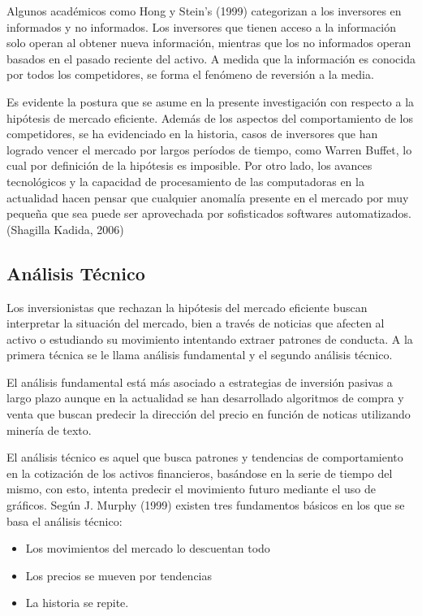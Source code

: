 \documentclass[a4paper,12pt]{Latex/Classes/PhDthesisPSnPDF}
\begin{document}
Algunos académicos como Hong y Stein's (1999) categorizan a los inversores en informados y no informados. Los inversores que tienen acceso a la información solo operan al obtener nueva información, mientras que los no informados operan basados en el pasado reciente del activo. A medida que la información es conocida por todos los competidores, se forma el fenómeno de reversión a la media.

Es evidente la postura que se asume en la presente investigación con respecto a la hipótesis de mercado eficiente. Además de los aspectos del comportamiento de los competidores, se ha evidenciado en la historia, casos de inversores que han logrado vencer el mercado por largos períodos de tiempo, como Warren Buffet, lo cual por definición de la hipótesis es imposible. Por otro lado, los avances tecnológicos y la capacidad de procesamiento de las computadoras en la actualidad hacen pensar que cualquier anomalía presente en el mercado por muy pequeña que sea puede ser aprovechada por sofisticados softwares automatizados. (Shagilla Kadida, 2006)

\subsection{Análisis Técnico}

Los inversionistas que rechazan la hipótesis del mercado eficiente buscan interpretar la situación del mercado, bien a través de noticias que afecten al activo o estudiando su movimiento intentando extraer patrones de conducta. A la primera técnica se le llama análisis fundamental y el segundo análisis técnico. 

El análisis fundamental está más asociado a estrategias de inversión pasivas a largo plazo aunque en la actualidad se han desarrollado algoritmos de compra y venta que buscan predecir la dirección del precio en función de noticas utilizando minería de texto.

El análisis técnico es aquel que busca patrones y tendencias de comportamiento en la cotización de los activos financieros, basándose en la serie de tiempo del mismo, con esto, intenta predecir el movimiento futuro mediante el uso de gráficos. Según J. Murphy (1999) existen tres fundamentos básicos en los que se basa el análisis técnico:

\begin{itemize}
\item Los movimientos del mercado lo descuentan  todo
\item Los precios se mueven por tendencias
\item La historia se repite.
\end{itemize}
\end{document}
